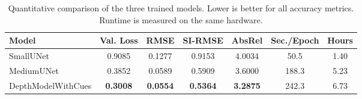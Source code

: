 \begin{table}[t]
    \centering
    \caption{Quantitative comparison of the three trained models. Lower is better for all accuracy metrics. Runtime is measured on the same hardware.}
    \label{tab:main_results}
    \begin{tabular}{lcccccc}
        \hline
        Model & Val. Loss & RMSE & SI-RMSE & AbsRel & Sec./Epoch & Hours \\
        \hline
        SmallUNet & 0.9085 & 0.1277 & 0.9153 & 4.0034 & 50.5 & 1.40 \\
        MediumUNet & 0.3852 & 0.0589 & 0.5909 & 3.6000 & 188.3 & 5.23 \\
        DepthModelWithCues & \textbf{0.3008} & \textbf{0.0554} & \textbf{0.5364} & \textbf{3.2875} & 242.3 & 6.73 \\
        \hline
    \end{tabular}
\end{table}